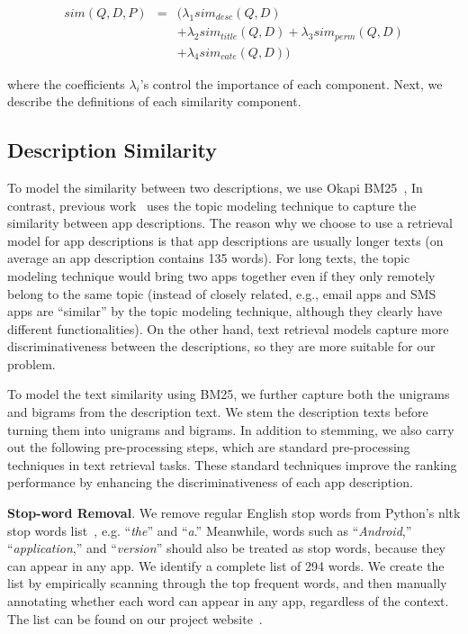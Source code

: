 \vspace{-0.2in}
\begin{eqnarray}
sim(Q, D, P) &=& (\lambda_1 sim_{desc}(Q, D) \nonumber\\
&& +\lambda_2 sim_{title}(Q, D) + \lambda_3 sim_{perm}(Q, D)\nonumber\\
&& +\lambda_4 sim_{cate}(Q, D))\label{eq:simty}
\end{eqnarray}

where the coefficients $\lambda_i$'s control the importance of each component. 
Next, we describe the definitions of each similarity component. 

\subsection{Description Similarity}

To model the similarity between two descriptions, we use Okapi BM25~\cite{FT006}, In contrast, previous work~\cite{conf/icse/GorlaTGZ14} uses the topic modeling technique to capture the similarity between app descriptions. 
The reason why we choose to use a retrieval model for app descriptions is that app descriptions are usually longer texts (on average an app description contains 135 words). 
For long texts, the topic modeling technique would bring two apps together even if they only remotely belong to the same topic (instead of closely related, e.g., email apps and SMS apps are ``similar'' by the topic modeling technique, although they clearly have different functionalities). 
On the other hand, text retrieval models capture more discriminativeness between the descriptions, so they are more suitable for our problem. 

To model the text similarity using BM25, we further capture both the unigrams and bigrams from the description text. 
We stem the description texts before turning them into unigrams and bigrams. \tabularnewline
In addition to stemming, we also carry out the following pre-processing steps, which are standard pre-processing techniques in text retrieval tasks. 
These standard techniques improve the ranking performance by enhancing the discriminativeness of each app description. 

\textbf{Stop-word Removal}. We remove regular English stop words from Python's nltk stop words list~\cite{nltk}, e.g. ``\emph{the}'' and ``\emph{a}.''
Meanwhile, words such as ``\emph{Android},'' ``\emph{application},'' and ``\emph{version}'' should also be treated as stop words, because they can appear in any app. 
We identify a complete list of 294 words. 
We create the list by empirically scanning through the top frequent words, and then manually annotating whether each word can appear in any app, regardless of the context. 
The list can be found on  our project website~\cite{clapproj}.

